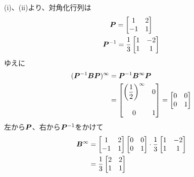 \begin{ans*}
\begin{enumerate}[label=(\arabic*)]
    (i)、(ii)より、対角化行列\bP は
    \begin{gather}
      \bm{P} =
      \begin{bmatrix}
        1 & 2 \\-1 & 1
      \end{bmatrix} \\
      \bm{P}^{-1} = \frac{1}{3}
      \begin{bmatrix}
        1 & -2 \\1 & 1
      \end{bmatrix}
    \end{gather}
    ゆえに
    \begin{align}
      (\bm{P}^{-1}\bm{B}\bm{P})^{\infty}
      &= \bm{P}^{-1}\bm{B}^{\infty}\bm{P}\\
      &=
      \begin{bmatrix}
        \biggl({\displaystyle \frac{1}{2}}\biggr)^{\infty} & 0 \\ & \\ 0 & 1
      \end{bmatrix} =
      \begin{bmatrix}
        0 & 0 \\ 0 & 1
      \end{bmatrix}
    \end{align}
    左から$\bm{P}$、右から$\bm{P}^{-1}$をかけて
    \begin{align}
      \bm{B}^{\infty}
      &=
      \begin{bmatrix}
        1 & 2 \\
        -1 & 1 \\
      \end{bmatrix}
      \begin{bmatrix}
        0 & 0 \\
        0 & 1 \\
      \end{bmatrix}
      \cdot\frac{1}{3}
      \begin{bmatrix}
        1 & -2 \\
        1 & 1 \\
      \end{bmatrix}\\
      &= \frac{1}{3}
      \begin{bmatrix}
        2 & 2 \\
        1 & 1 \\
      \end{bmatrix}
    \end{align}
  \end{enumerate}
\end{ans*}
